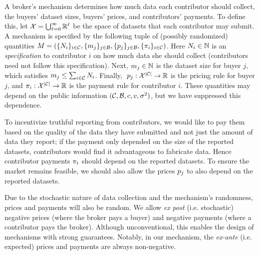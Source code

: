 A broker's mechanism determines how much data each contributor should collect, 
the buyers' dataset sizes, buyers' prices, and contributors' payments.
To define this, let $\mathcal{X} = \bigcup_{\ell=0}^\infty \mathbb{R}^\ell$
be the space of datasets that each contributor may submit.
A mechanism is specified by the following tuple of (possibly randomized) quantities
$M = \left(\{N_i\}_{i\in\mathcal{C}}, \{m_j\}_{j \in \mathcal{B}}, \{p_j\}_{j \in \mathcal{B}}, \{\pi_i\}_{i \in \mathcal{C}}\right)
$.
Here $N_i\in\mathbb{N}$ is an \emph{specification} to contributor $i$ on how much data she should collect (contributors need not follow this specification).
Next,  $m_j \in \mathbb{N}$
is the dataset size for buyer $j$,  which satisfies $m_j\leq\sum_{i\in\mathcal{C}}N_i$.
Finally,
$\;p_j : \mathcal{X}^{|\mathcal{C}|} \to \mathbb{R}$ is the pricing rule for buyer $j$, and  
$\pi_i : \mathcal{X}^{|\mathcal{C}|} \to \mathbb{R}$ is the payment rule for contributor $i$.
These quantities may depend on the public information $(\mathcal{C}, \mathcal{B}, c,v, \sigma^2)$, but we have suppressed this dependence.

To incentivize truthful reporting from contributors, we would like to pay them based on the quality of the data they have submitted  and not just the amount of data they report;
if the payment only depended on the size of the reported datasets, contributors would find it advantageous to fabricate data.
Hence contributor payments $\pi_i$ should depend on the reported datasets.
To  ensure the market remains feasible, we should also allow the prices $p_j$ to also depend on the reported datasets.


Due to the stochastic nature of data collection and the mechanism's randomness, prices and payments will also be random. We allow \emph{ex post} (i.e. stochastic) negative prices (where the broker pays a buyer) and negative payments (where a contributor pays the broker). Although unconventional, this enables the design of mechanisms with strong guarantees. Notably, in our mechanism, the \emph{ex-ante} (i.e. expected) prices and payments are always non-negative.


